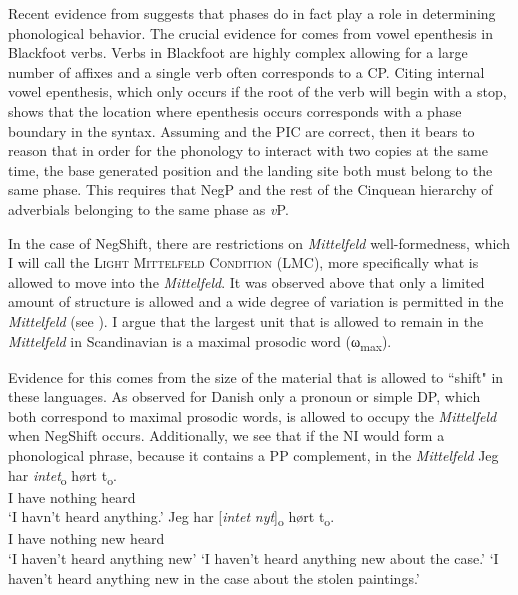 \documentclass[12pt, letterpaper]{article}
\newcommand{\sub}[1]{\textsubscript{#1}}
\begin{document}
Recent evidence from \citet{weberPhaseBasedConstraints2021} suggests that phases do in fact play a role in determining phonological behavior. The crucial evidence for \citeauthor{weberPhaseBasedConstraints2021} comes from vowel epenthesis in Blackfoot verbs. Verbs in Blackfoot are highly complex allowing for a large number of affixes and a single verb often corresponds to a CP. Citing internal vowel epenthesis, which only occurs if the root of the verb will begin with a stop, \citeauthor{weberPhaseBasedConstraints2021} shows that the location where epenthesis occurs corresponds with a phase boundary in the syntax. Assuming \citeauthor{weberPhaseBasedConstraints2021} and the PIC are correct, then it bears to reason that in order for the phonology to interact with two copies at the same time, the base generated position and the landing site both must belong to the same phase. This requires that NegP and the rest of the Cinquean hierarchy of adverbials \citep{cinqueAdverbsFunctionalHeads1999} belonging to the same phase as \emph{v}P.

In the case of NegShift, there are restrictions on \emph{Mittelfeld} well-formedness, which I will call the \textsc{Light Mittelfeld Condition} (LMC), more specifically what is allowed to move into the \emph{Mittelfeld}. It was observed above that only a limited amount of structure is allowed and a wide degree of variation is permitted in the \emph{Mittelfeld} (see \cite{haiderMittelfeldPhenomenaScrambling2017}). I argue that the largest unit that is allowed to remain in the \emph{Mittelfeld} in Scandinavian is a maximal prosodic word (ω\sub{max}).

Evidence for this comes from the size of the material that is allowed to ``shift" in these languages. As observed for Danish only a pronoun or simple DP, which both correspond to maximal prosodic words, is allowed to occupy the \emph{Mittelfeld} when NegShift occurs. Additionally, we see that if the NI would form a phonological phrase, because it contains a PP complement, in the \emph{Mittelfeld} 
\ea 
	\ea 
		\gll Jeg har \textit{intet}\textsubscript{o} hørt t\textsubscript{o}.\\
		I have nothing heard\\
		\glt  `I havn't heard anything.'
	\ex 
		\gll Jeg har [\textit{intet} \textit{nyt}]\textsubscript{o} hørt t\textsubscript{o}.\\
		I have nothing new heard\\
		\glt `I haven't heard anything new'
		\glt `I haven't heard anything new about the case.'
		\glt `I haven't heard anything new in the case about the stolen paintings.'
	\z  	
\z 
\end{document}
